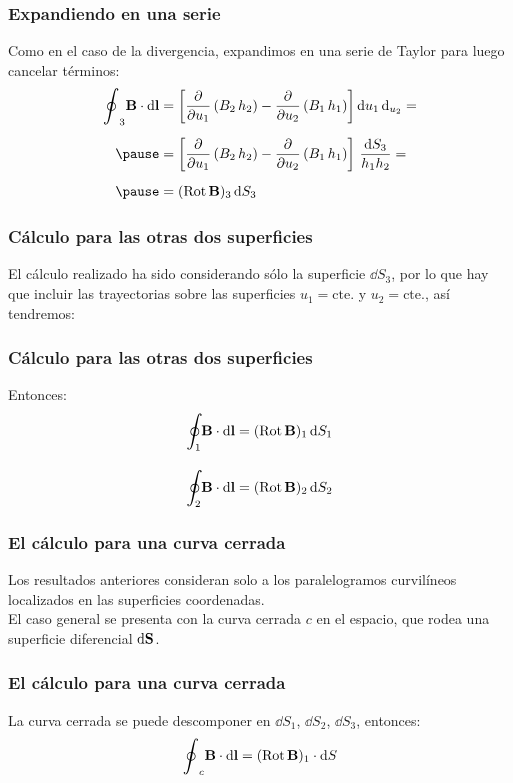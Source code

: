 \documentclass[12pt]{beamer}
\begin{document}
\begin{frame}
\frametitle{Expandiendo en una serie}
Como en el caso de la divergencia, expandimos en una serie de Taylor para luego cancelar términos:
\pause
\begin{eqnarray*}
\begin{aligned}
\scaleoint{6ex}_{3} \vb{B} \cdot \dd{\vb{l}} &= \left[ \displaystyle \pdv{u_{1}} \left( B_{2} \, h_{2}\right) - \pdv{u_{2}} \left( B_{1} \, h_{1} \right) \right] \dd{u_{1}} \dd_{u_{2}} = \\[0.5em] \pause
&= \left[ \pdv{u_{1}} \left( B_{2} \, h_{2}\right) - \pdv{u_{2}} \left( B_{1} \, h_{1} \right) \right] \, \dfrac{\dd{S_{3}}}{h_{1} h_{2}} = \\[0.5em] \pause
&= ({\rm{Rot}} \, \vb{B})_{3} \dd{S_{3}}
\end{aligned}
\end{eqnarray*}
\end{frame}
\begin{frame}
\frametitle{Cálculo para las otras dos superficies}
El cálculo realizado ha sido considerando sólo la superficie $\dd{S_{3}}$, por lo que hay que incluir las trayectorias sobre las superficies $u_{1} = \text{cte.}$ y $u_{2} = \text{cte.}$, así tendremos:
\end{frame}
\begin{frame}
\frametitle{Cálculo para las otras dos superficies}
Entonces:
\pause
\begin{align*}
\scaleoint{6ex}_{\bs 1} \vb{B} \cdot \dd{\vb{l}} &= ({\rm{Rot}} \, \vb{B})_{1} \dd{S_{1}} \\[1em]
\scaleoint{6ex}_{\bs 2} \vb{B} \cdot \dd{\vb{l}} &= ({\rm{Rot}} \, \vb{B})_{2} \dd{S_{2}}
\end{align*}
\end{frame}
\begin{frame}
\frametitle{El cálculo para una curva cerrada}
Los resultados anteriores consideran solo a los paralelogramos curvilíneos localizados en las superficies coordenadas.
\\
\bigskip
\pause
El caso general se presenta con la curva cerrada $c$ en el espacio, que rodea una superficie diferencial $\dd{\vb{S}}$.
\end{frame}
\begin{frame}
\frametitle{El cálculo para una curva cerrada}
La curva cerrada se puede descomponer en $\dd{S_{1}}$, $\dd{S_{2}}$, $\dd{S_{3}}$, entonces:
\pause
\begin{align*}
\scaleoint{6ex}_{c} \vb{B} \cdot \dd{\vb{l}} = ({\rm{Rot}} \, \vb{B})_{1} \cdot \dd{S} 
\end{align*}
\end{frame}
\end{document}
